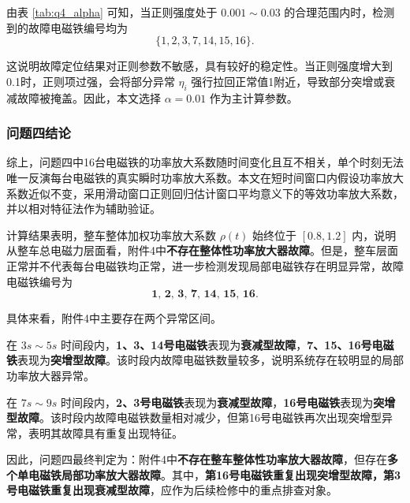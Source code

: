 \documentclass[a4paper]{nmmcm}
\begin{document}
由表 \ref{tab:q4_alpha} 可知，当正则强度处于 $0.001\sim0.03$ 的合理范围内时，检测到的故障电磁铁编号均为
\[
\{1,2,3,7,14,15,16\}.
\]

这说明故障定位结果对正则参数不敏感，具有较好的稳定性。当正则强度增大到0.1时，正则项过强，会将部分异常 $\eta_i$ 强行拉回正常值1附近，导致部分突增或衰减故障被掩盖。因此，本文选择 $\alpha=0.01$ 作为主计算参数。

\subsubsection{问题四结论}

综上，问题四中16台电磁铁的功率放大系数随时间变化且互不相关，单个时刻无法唯一反演每台电磁铁的真实瞬时功率放大系数。本文在短时间窗口内假设功率放大系数近似不变，采用滑动窗口正则回归估计窗口平均意义下的等效功率放大系数，并以相对特征法作为辅助验证。

计算结果表明，整车整体加权功率放大系数 $\rho(t)$ 始终位于 $[0.8,1.2]$ 内，说明从整车总电磁力层面看，附件4中\textbf{不存在整体性功率放大器故障}。但是，整车层面正常并不代表每台电磁铁均正常，进一步检测发现局部电磁铁存在明显异常，故障电磁铁编号为
\[
\textbf{1,\ 2,\ 3,\ 7,\ 14,\ 15,\ 16}.
\]

具体来看，附件4中主要存在两个异常区间。

在 \textbf{$3s\sim5s$} 时间段内，\textbf{1、3、14号电磁铁}表现为\textbf{衰减型故障}，\textbf{7、15、16号电磁铁}表现为\textbf{突增型故障}。该时段内故障电磁铁数量较多，说明系统存在较明显的局部功率放大器异常。

在 \textbf{$7s\sim9s$} 时间段内，\textbf{2、3号电磁铁}表现为\textbf{衰减型故障}，\textbf{16号电磁铁}表现为\textbf{突增型故障}。该时段内故障电磁铁数量相对减少，但第16号电磁铁再次出现突增型异常，表明其故障具有重复出现特征。

因此，问题四最终判定为：附件4中\textbf{不存在整车整体性功率放大器故障}，但存在\textbf{多个单电磁铁局部功率放大器故障}。其中，\textbf{第16号电磁铁重复出现突增型故障，第3号电磁铁重复出现衰减型故障}，应作为后续检修中的重点排查对象。
\end{document}
